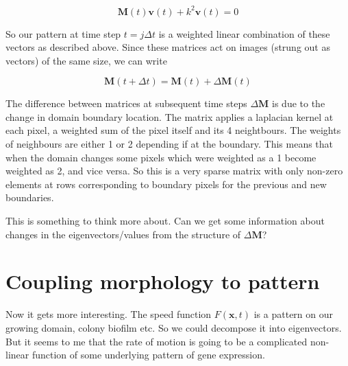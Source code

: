 \documentclass{article}
\renewcommand{\vec}[1]{\mathbf{#1}}
\newcommand{\mat}{\mathbf}
\begin{document}
\begin{equation}
\mat{M}(t) \vec{v}(t) + k^2 \vec{v}(t) = 0
\end{equation}

So our pattern at time step $t=j\Delta t$ is a weighted linear combination of
these vectors as described above.
Since these matrices act on images (strung out as vectors) of the same size, we
can write

\begin{equation}
\mat{M}(t+\Delta t) = \mat{M}(t) + \Delta\mat{M}(t)
\end{equation}

The difference between matrices at subsequent time steps $\Delta\mat{M}$ is
due to the change in domain boundary location. The matrix applies a laplacian
kernel at each pixel, a weighted sum of the pixel itself and its 4 neightbours.
The weights of neighbours are either 1 or 2 depending if at the boundary.
This means that when the domain changes some pixels which were weighted as a 1
become weighted as 2, and vice versa. So this is a very sparse matrix with only
non-zero elements at rows corresponding to boundary pixels for the previous and
new boundaries.

This is something to think more about. Can we get some information about changes
in the eigenvectors/values from the structure of $\Delta\mat{M}$?

\begin{comment}
We can also just directly think about a time varying matrix, eigenvector and
eigenvalue $\mat{A}(t)v(t) = k(t)^2 v(t)$. And 

\begin{equation}
(\mat{A}(t) + k(t)^2\mat{I}) v(t) = 0
\end{equation}

differentiate both sides

\begin{equation}
\left( \frac{\partial\mat{A}}{\partial t} + 2k\frac{\partial k}{\partial t}
\mat{I} \right) v 
+
(\mat{A}(t) + k(t)^2\mat{I}) \frac{\partial v}{\partial t}
\end{equation}

\end{comment}

\section{Coupling morphology to pattern}
Now it gets more interesting. The speed function $F(\vec{x},t)$ is
a pattern on our growing domain, colony biofilm etc. So we could decompose it into
eigenvectors. But it seems to me that the rate of motion is going to be a
complicated non-linear function of some underlying pattern of gene expression.
\end{document}
